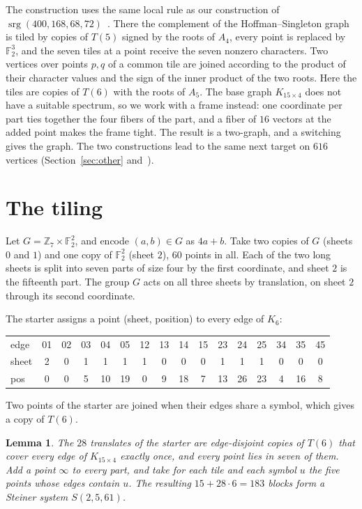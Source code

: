 \documentclass[11pt]{amsart}
\newtheorem{lemma}[theorem]{Lemma}
\theoremstyle{remark}
\newcommand{\F}{\mathbb{F}}
\newcommand{\Z}{\mathbb{Z}}
\DeclareMathOperator{\srg}{srg}
\begin{document}
The construction uses the same local rule as our construction of $\srg(400,168,68,72)$~\cite{P400}. There the complement of the Hoffman--Singleton graph is tiled by copies of $T(5)$ signed by the roots of $A_4$, every point is replaced by $\F_2^3$, and the seven tiles at a point receive the seven nonzero characters. Two vertices over points $p,q$ of a common tile are joined according to the product of their character values and the sign of the inner product of the two roots. Here the tiles are copies of $T(6)$ with the roots of $A_5$. The base graph $K_{15\times4}$ does not have a suitable spectrum, so we work with a frame instead: one coordinate per part ties together the four fibers of the part, and a fiber of $16$ vectors at the added point makes the frame tight. The result is a two-graph, and a switching gives the graph. The two constructions lead to the same next target on $616$ vertices (Section~\ref{sec:other} and~\cite{P400}).

\section{The tiling}\label{sec:tiling}

Let $G=\Z_7\times\F_2^2$, and encode $(a,b)\in G$ as $4a+b$. Take two copies of $G$ (sheets $0$ and $1$) and one copy of $\F_2^2$ (sheet $2$), $60$ points in all. Each of the two long sheets is split into seven parts of size four by the first coordinate, and sheet $2$ is the fifteenth part. The group $G$ acts on all three sheets by translation, on sheet $2$ through its second coordinate.

The starter assigns a point (sheet, position) to every edge of $K_6$:
\begin{center}\small
\begin{tabular}{@{}l*{15}{c}@{}}
\toprule
edge & 01&02&03&04&05&12&13&14&15&23&24&25&34&35&45\\
sheet& 2&0&1&1&1&1&0&0&0&1&1&1&0&0&0\\
pos & 0&0&5&10&19&0&9&18&7&13&26&23&4&16&8\\
\bottomrule
\end{tabular}
\end{center}
Two points of the starter are joined when their edges share a symbol, which gives a copy of $T(6)$.

\begin{lemma}\label{lem:tiling}
The $28$ translates of the starter are edge-disjoint copies of $T(6)$ that cover every edge of $K_{15\times4}$ exactly once, and every point lies in seven of them. Add a point $\infty$ to every part, and take for each tile and each symbol $u$ the five points whose edges contain $u$. The resulting $15+28\cdot6=183$ blocks form a Steiner system $S(2,5,61)$.
\end{lemma}
\end{document}

